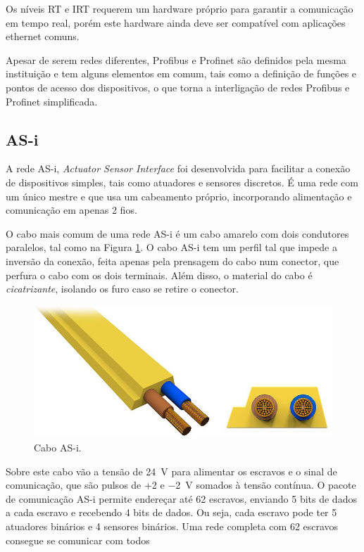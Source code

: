 Os níveis RT e IRT requerem um hardware próprio para garantir a comunicação em tempo real, porém este hardware ainda deve ser compatível com aplicações ethernet comuns.

Apesar de serem redes diferentes, Profibus e Profinet são definidos pela mesma instituição e tem alguns elementos em comum, tais como a definição de funções e pontos de acesso dos dispositivos, o que torna a interligação de redes Profibus e Profinet simplificada. 

\subsection{AS-i}

A rede AS-i, \emph{Actuator Sensor Interface} foi desenvolvida para facilitar a conexão de dispositivos simples, tais como atuadores e sensores discretos. É uma rede com um único mestre e que usa um cabeamento próprio, incorporando alimentação e comunicação em apenas 2 fios.

O cabo mais comum de uma rede AS-i é um cabo amarelo com dois condutores paralelos, tal como na Figura \ref{fig:asi}. O cabo AS-i tem um perfil tal que impede a inversão da conexão, feita apenas pela prensagem do cabo num conector, que perfura o cabo com os dois terminais. Além disso, o material do cabo é \emph{cicatrizante}, isolando os furo caso se retire o conector.

\begin{figure}
    \centering
    \includegraphics[width=\textwidth]{figuras/ASiCable}
    \caption{Cabo AS-i.}\label{fig:asi}
\end{figure}

Sobre este cabo vão a tensão de \SI{24}{V} para alimentar os escravos e o sinal de comunicação, que são pulsos de +2 e \SI{-2}{V} somados à tensão contínua. O pacote de comunicação AS-i permite endereçar até 62 escravos, enviando 5 bits de dados a cada escravo e recebendo 4 bits de dados. Ou seja, cada escravo pode ter 5 atuadores binários e 4 sensores binários. Uma rede completa com 62 escravos consegue se comunicar com todos 

